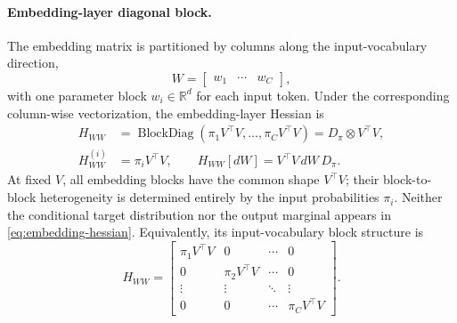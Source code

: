 \documentclass[11pt]{article}
\newcommand{\R}{\mathbb{R}}
\newcommand{\BlockDiag}{\operatorname{BlockDiag}}
\begin{document}
\paragraph{Embedding-layer diagonal block.}
The embedding matrix is partitioned by columns along the input-vocabulary
direction,
\begin{equation*}
W=
\begin{bmatrix}
w_1&\cdots&w_C
\end{bmatrix},
\end{equation*}
with one parameter block \(w_i\in\R^d\) for each input token.  Under the
corresponding column-wise vectorization, the embedding-layer Hessian is
\begin{equation}
\begin{aligned}
H_{WW}
&=\BlockDiag\!\left(
\pi_1V^\top V,\ldots,\pi_CV^\top V
\right)
=D_\pi\otimes V^\top V,\\
H_{WW}^{(i)}
&=\pi_iV^\top V,
\qquad
H_{WW}[dW]=V^\top V\,dW\,D_\pi.
\end{aligned}
\label{eq:embedding-hessian}
\end{equation}
At fixed \(V\), all embedding blocks have the common shape \(V^\top V\);
their block-to-block heterogeneity is determined entirely by the input
probabilities \(\pi_i\).  Neither the conditional target distribution nor the
output marginal appears in \eqref{eq:embedding-hessian}.
Equivalently, its input-vocabulary block structure is
\begin{equation*}
H_{WW}
=
\begin{bmatrix}
\pi_1V^\top V & 0 & \cdots & 0\\
0 & \pi_2V^\top V & \cdots & 0\\
\vdots & \vdots & \ddots & \vdots\\
0 & 0 & \cdots & \pi_CV^\top V
\end{bmatrix}.
\end{equation*}
\end{document}
